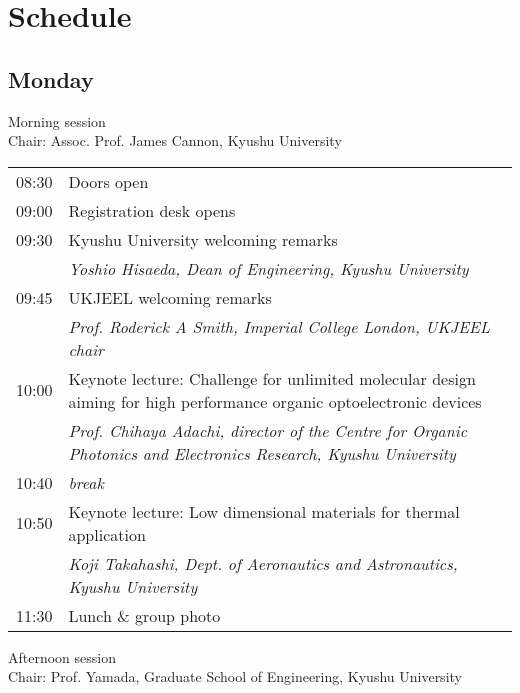 \section{Schedule}

\subsection*{Monday}

Morning session \\
Chair: Assoc. Prof. James Cannon, Kyushu University

\noindent\begin{tabular}{|l|l|}
    \hline
    08:30   & Doors open \\
    09:00   & Registration desk opens \\
    09:30   & Kyushu University welcoming remarks \\
            & \emph{Yoshio Hisaeda, Dean of Engineering, Kyushu University} \\
    09:45   & UKJEEL welcoming remarks \\
            & \emph{Prof. Roderick A Smith, Imperial College London, UKJEEL chair} \\
    10:00   & Keynote lecture: Challenge for unlimited molecular design aiming for high performance organic optoelectronic devices \\
            & \emph{Prof. Chihaya Adachi, director of the Centre for Organic Photonics and Electronics Research, Kyushu University} \\
    10:40   & \emph{break} \\
    10:50   & Keynote lecture: Low dimensional materials for thermal application \\
            & \emph{Koji Takahashi, Dept. of Aeronautics and Astronautics, Kyushu University} \\
    11:30   & Lunch \& group photo \\
    \hline
\end{tabular}

\vspace{2em}
\noindent Afternoon session \\
Chair: Prof. Yamada, Graduate School of Engineering, Kyushu University


